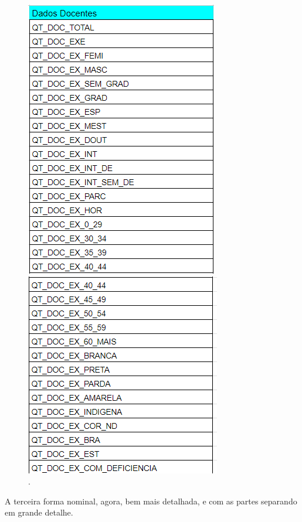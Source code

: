 \documentclass[12pt]{article}
\begin{document}
\begin{figure}[h!]
\centering
\includegraphics[width=.3\textwidth]{Segunda forma nominal 4.PNG}
\caption{.}

\centering
\includegraphics[width=.3\textwidth]{Segunda forma nominal 5.PNG}
\caption{.}

\end{figure}

A terceira forma nominal, agora, bem mais detalhada, e com as partes separando em grande detalhe.
\end{document}
